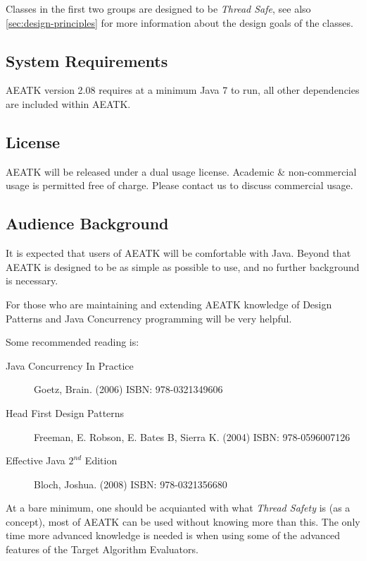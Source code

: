 \documentclass[11pt,letterpaper,oneside]{article}
\begin{document}
Classes in the first two groups are designed to be \emph{Thread Safe}, see also \ref{sec:design-principles} for more information about the design goals of the classes.

\subsection{System Requirements}

AEATK version 2.08 requires at a minimum Java 7 to run, all other dependencies are included within AEATK.

\subsection{License}

AEATK will be released under a dual usage license. Academic \& non-commercial usage is permitted free of charge. Please contact us to discuss commercial usage.

\subsection{Audience Background}

It is expected that users of AEATK will be comfortable with Java.  Beyond that AEATK is designed to be as simple as possible to use, and no further background is necessary. 

For those who are maintaining and extending AEATK knowledge of Design Patterns and Java Concurrency programming will be very helpful.

Some recommended reading is:

\begin{description}

\item[Java Concurrency In Practice] Goetz, Brain. (2006) ISBN: 978-0321349606

\item[Head First Design Patterns] Freeman, E. Robson, E. Bates B, Sierra K. (2004) ISBN: 978-0596007126

\item[Effective Java $2^{nd}$ Edition] Bloch, Joshua. (2008) ISBN: 978-0321356680 
\end{description}

At a bare minimum, one should be acquianted with what \emph{Thread Safety} is (as a concept), most of AEATK can be used without knowing more than this. The only time more advanced knowledge is needed is when using some of the advanced features of the Target Algorithm Evaluators.
\end{document}
